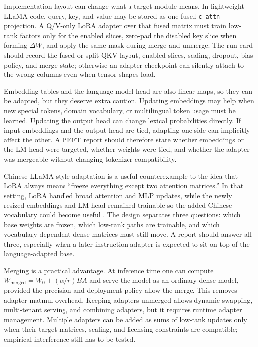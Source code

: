 Implementation layout can change what a target module means. In lightweight LLaMA code, query, key, and value may be stored as one fused \texttt{c\_attn} projection. A Q/V-only LoRA adapter over that fused matrix must train low-rank factors only for the enabled slices, zero-pad the disabled key slice when forming $\Delta W$, and apply the same mask during merge and unmerge. The run card should record the fused or split QKV layout, enabled slices, scaling, dropout, bias policy, and merge state; otherwise an adapter checkpoint can silently attach to the wrong columns even when tensor shapes load.

Embedding tables and the language-model head are also linear maps, so they can be adapted, but they deserve extra caution. Updating embeddings may help when new special tokens, domain vocabulary, or multilingual token usage must be learned. Updating the output head can change lexical probabilities directly. If input embeddings and the output head are tied, adapting one side can implicitly affect the other. A PEFT report should therefore state whether embeddings or the LM head were targeted, whether weights were tied, and whether the adapter was mergeable without changing tokenizer compatibility.

Chinese LLaMA-style adaptation is a useful counterexample to the idea that LoRA always means ``freeze everything except two attention matrices.'' In that setting, LoRA handled broad attention and MLP updates, while the newly resized embeddings and LM head remained trainable so the added Chinese vocabulary could become useful \cite{cui2023efficient}. The design separates three questions: which base weights are frozen, which low-rank paths are trainable, and which vocabulary-dependent dense matrices must still move. A report should answer all three, especially when a later instruction adapter is expected to sit on top of the language-adapted base.

Merging is a practical advantage. At inference time one can compute $W_{\mathrm{merged}}=W_0+(\alpha/r)BA$ and serve the model as an ordinary dense model, provided the precision and deployment policy allow the merge. This removes adapter matmul overhead. Keeping adapters unmerged allows dynamic swapping, multi-tenant serving, and combining adapters, but it requires runtime adapter management. Multiple adapters can be added as sums of low-rank updates only when their target matrices, scaling, and licensing constraints are compatible; empirical interference still has to be tested.

